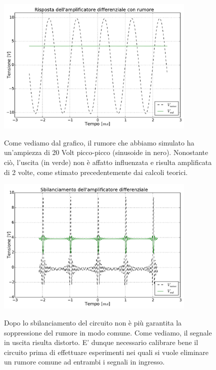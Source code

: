 \begin{figure}[ht]
 \centering
   {\includegraphics[width=0.85\textwidth]{../E05/latex/amp_diff.pdf}}
 \caption{Come vediamo dal grafico, il rumore che abbiamo simulato ha un'ampiezza di 20 Volt picco-picco (sinusoide in nero). Nonostante ciò, l'uscita (in verde) non è affatto influenzata e risulta amplificata di 2 volte, come stimato precedentemente dai calcoli teorici. }
 \label{gr5:amp_diff}
\end{figure}

\begin{figure}[ht]
 \centering
   {\includegraphics[width=0.85\textwidth]{../E05/latex/sbil_amp_diff.pdf}}
 \caption{Dopo lo sbilanciamento del circuito non è più garantita la soppressione del rumore in modo comune. Come vediamo, il segnale in uscita risulta distorto. E' dunque necessario calibrare bene il circuito prima di effettuare esperimenti nei quali si vuole eliminare un rumore comune ad entrambi i segnali in ingresso.}
 \label{gr5:sbil_amp_diff}
\end{figure}

